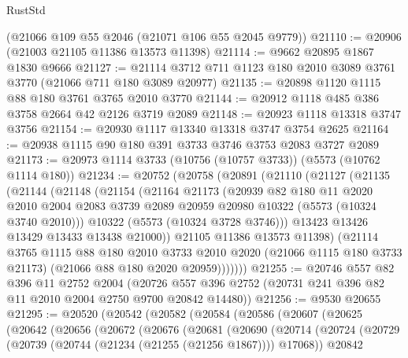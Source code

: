 \begin{lexlean}{RustStd}
\begin{coremodule}
    (@21066 @109 @55 @2046 (@21071 @106 @55 @2045 @9779))
@21110 := @20906 (@21003 @21105 @11386 @13573 @11398)
@21114 := @9662 @20895 @1867 @1830 @9666
@21127 := @21114 @3712 @711 @1123 @180 @2010 @3089 @3761 @3770 (@21066 @711 @180 @3089 @20977)
@21135 := @20898 @1120 @1115 @88 @180 @3761 @3765 @2010 @3770
@21144 := @20912 @1118 @485 @386 @3758 @2664 @42 @2126 @3719 @2089
@21148 := @20923 @1118 @13318 @3747 @3756
@21154 := @20930 @1117 @13340 @13318 @3747 @3754 @2625
@21164 := @20938 @1115 @90 @180 @391 @3733 @3746 @3753 @2083 @3727 @2089
@21173 := @20973 @1114 @3733 (@10756 (@10757 @3733)) (@5573 (@10762 @1114 @180))
@21234 := @20752
    (@20758
      (@20891
        (@21110
          (@21127
            (@21135
              (@21144
                (@21148
                  (@21154
                    (@21164
                      @21173
                      (@20939
                        @82
                        @180
                        @11
                        @2020
                        @2010
                        @2004
                        @2083
                        @3739
                        @2089
                        @20959
                        @20980
                        @10322
                        (@5573 (@10324 @3740 @2010)))
                      @10322
                      (@5573 (@10324 @3728 @3746)))
                    @13423
                    @13426
                    @13429
                    @13433
                    @13438
                    @21000))
                @21105
                @11386
                @13573
                @11398)
              (@21114
                @3765
                @1115
                @88
                @180
                @2010
                @3733
                @2010
                @2020
                (@21066 @1115 @180 @3733 @21173)
                (@21066 @88 @180 @2020 @20959)))))))
@21255 := @20746
    @557
    @82
    @396
    @11
    @2752
    @2004
    (@20726 @557 @396 @2752 (@20731 @241 @396 @82 @11 @2010 @2004 @2750 @9700 @20842 @14480))
@21256 := @9530 @20655
@21295 := @20520
    (@20542
      (@20582
        (@20584
          (@20586
            (@20607
              (@20625
                (@20642
                  (@20656
                    (@20672
                      (@20676
                        (@20681
                          (@20690
                            (@20714
                              (@20724
                                (@20729 (@20739 (@20744 (@21234 (@21255 (@21256 @1867)))) @17068))
                                @20842

\end{coremodule}
\end{lexlean}
